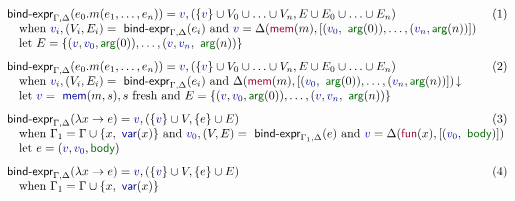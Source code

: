 \documentclass[english,crc]{programming}
\theoremstyle{plain}
\theoremstyle{definition}
\newcommand{\ident}[1]{\textnormal{\textcolor{idclr}{\sffamily #1}}}
\newcommand{\bndclr}[1]{\textcolor{kvdclr}{#1}}
\newcommand{\bnd}[1]{\textnormal{\textcolor{kvdclr}{\sffamily #1}}}
\newcommand{\bknd}[1]{\textnormal{\textcolor{prepclr}{\sffamily #1}}}
\newcommand{\blbl}[1]{\textnormal{\textcolor{numclr}{\sffamily #1}}}
\begin{document}
\begin{figure}[t]
\vspace{-1em}
\begin{equation*}
\hspace{-1.5em}
\begin{array}{ll}
\ident{bind-expr}_{\Gamma, \Delta}(e_0.m(e_1, \ldots, e_n)) = \bndclr{v}, (\{\bndclr{v}\} \cup V_0 \cup \ldots \cup V_n, E \cup E_0 \cup \ldots \cup E_n) &\hspace{-2em}(1)~~\\
\quad \textnormal{when}~\bndclr{v_i}, (V_i, E_i) = \ident{bind-expr}_{\Gamma, \Delta}(e_i)
~\textnormal{and}~\bndclr{v} = \Delta(\bknd{mem}(m),[(\bndclr{v_0}, \blbl{arg}(0)), \ldots, (\bndclr{v_n}, \blbl{arg}(n))])\\
\quad \textnormal{let}~E = \{ (\bndclr{v}, \bndclr{v_0}, \blbl{arg}(0)), \ldots, (\bndclr{v}, \bndclr{v_n}, \blbl{arg}(n))\}
\\[0.75em]
\ident{bind-expr}_{\Gamma, \Delta}(e_0.m(e_1, \ldots, e_n)) = \bndclr{v}, (\{\bndclr{v}\} \cup V_0 \cup \ldots \cup V_n, E \cup E_0 \cup \ldots \cup E_n)&\hspace{-2em}(2)\\
\quad \textnormal{when}~\bndclr{v_i}, (V_i, E_i) = \ident{bind-expr}_{\Gamma, \Delta}(e_i)
~\textnormal{and}~\Delta(\bknd{mem}(m),[(\bndclr{v_0}, \blbl{arg}(0)), \ldots, (\bndclr{v_n}, \blbl{arg}(n))])\!\downarrow\\
\quad \textnormal{let}~\bndclr{v} = \bnd{mem}(m, s), s~\textnormal{fresh}
~\textnormal{and}~E = \{ (\bndclr{v}, \bndclr{v_0}, \blbl{arg}(0)), \ldots, (\bndclr{v},\bndclr{v_n}, \blbl{arg}(n)) \}
\\[0.75em]
\ident{bind-expr}_{\Gamma, \Delta}(\lambda x \rightarrow e) = \bndclr{v}, (\{\bndclr{v}\} \cup V, \{e\} \cup E)&\hspace{-2em}(3)\\
\quad \textnormal{when}~\Gamma_1 = \Gamma \cup \{ x, \bnd{var}(x) \}
~\textnormal{and}~\bndclr{v_0}, (V, E) = \ident{bind-expr}_{\Gamma_1, \Delta}(e)
~\textnormal{and}~\bndclr{v} = \Delta(\bknd{fun}(x),[(\bndclr{v_0}, \blbl{body})])\\
\quad \textnormal{let}~e = (\bndclr{v}, \bndclr{v_0}, \blbl{body})
\\[0.75em]
\ident{bind-expr}_{\Gamma, \Delta}(\lambda x \rightarrow e) = \bndclr{v}, (\{\bndclr{v}\} \cup V, \{e\} \cup E)&\hspace{-2em}(4)\\
\quad \textnormal{when}~\Gamma_1 = \Gamma \cup \{ x, \bnd{var}(x) \}

\end{array}
\end{equation*}
\end{figure}
\end{document}
